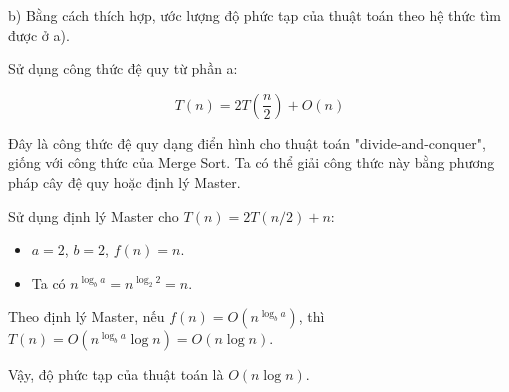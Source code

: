 \documentclass[12pt,a4paper]{article}
\begin{document}
b) Bằng cách thích hợp, ước lượng độ phức tạp của thuật toán theo hệ thức tìm được ở a).

Sử dụng công thức đệ quy từ phần a:

\[
T(n) = 2T\left(\frac{n}{2}\right) + O(n)
\]

Đây là công thức đệ quy dạng điển hình cho thuật toán "divide-and-conquer", giống với công thức của Merge Sort. Ta có thể giải công thức này bằng phương pháp cây đệ quy hoặc định lý Master.

Sử dụng định lý Master cho \( T(n) = 2T(n/2) + n \):

\begin{itemize}
    \item \( a = 2 \), \( b = 2 \), \( f(n) = n \).
    \item Ta có \( n^{\log_b a} = n^{\log_2 2} = n \).
\end{itemize}

Theo định lý Master, nếu \( f(n) = O(n^{\log_b a}) \), thì \( T(n) = O(n^{\log_b a} \log n) = O(n \log n) \).

Vậy, độ phức tạp của thuật toán là \( O(n \log n) \).
\end{document}
